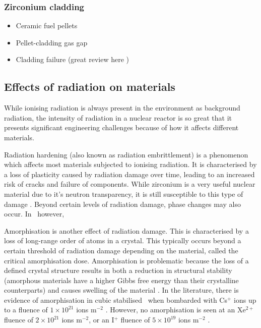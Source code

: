 \subsubsection{Zirconium cladding}



\begin{itemize}
\item Ceramic fuel pellets
\item Pellet-cladding gas gap
\item Cladding failure (great review here \cite{alam2011review})
\end{itemize}

\subsection{Effects of radiation on materials}

While ionising radiation is always present in the environment as background radiation, the intensity of radiation in a nuclear reactor is so great that it presents significant engineering challenges because of how it affects different materials.

Radiation hardening (also known as radiation embrittlement) is a phenomenon which affects most materials subjected to ionising radiation. It is characterised by a loss of plasticity caused by radiation damage over time, leading to an increased risk of cracks and failure of components. While zirconium is a very useful nuclear material due to it's neutron transparency, it is still susceptible to this type of damage \cite{Wisner1998CombinedZircaloy-2}. Beyond certain levels of radiation damage, phase changes may also occur. In \zirconia\ however,  

Amorphisation is another effect of radiation damage. This is characterised by a loss of long-range order of atoms in a crystal. This typically occurs beyond a certain threshold of radiation damage depending on the material, called the critical amorphisation dose. Amorphisation is problematic because the loss of a defined crystal structure results in both a reduction in structural stability (amorphous materials have a higher Gibbs free energy than their crystalline counterparts) and causes swelling of the material \cite{Einfal2013MethodsState}. In the literature, there is evidence of amorphisation in cubic stabilised \zirconia\ when bombarded with Cs$^{+}$ ions up to a fluence of $1 \times 10^{21}$ ions m$^{-2}$ \cite{amorphization2000wang}. However, no amorphisation is seen at an Xe$^{2+}$ fluence of $2 \times 10^{21}$ ions m$^{-2}$, or an I$^{+}$ fluence of $5 \times 10^{19}$ ions m$^{-2}$ \cite{sickafus1999radiation}.

